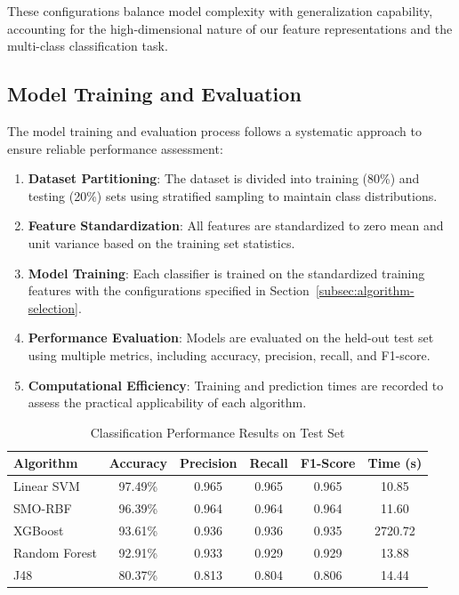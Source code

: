 These configurations balance model complexity with generalization capability, accounting for the high-dimensional nature of our feature representations and the multi-class classification task.

\subsection{Model Training and Evaluation}
\label{subsec:model-training}

The model training and evaluation process follows a systematic approach to ensure reliable performance assessment:

\begin{enumerate}
    \item \textbf{Dataset Partitioning}: The dataset is divided into training (80\%) and testing (20\%) sets using stratified sampling to maintain class distributions.
    
    \item \textbf{Feature Standardization}: All features are standardized to zero mean and unit variance based on the training set statistics.
    
    \item \textbf{Model Training}: Each classifier is trained on the standardized training features with the configurations specified in Section~\ref{subsec:algorithm-selection}.
    
    \item \textbf{Performance Evaluation}: Models are evaluated on the held-out test set using multiple metrics, including accuracy, precision, recall, and F1-score.
    
    \item \textbf{Computational Efficiency}: Training and prediction times are recorded to assess the practical applicability of each algorithm.
\end{enumerate}

\begin{table}[!htbp]
    \centering
    \caption{Classification Performance Results on Test Set}
    \label{tab:classification-results}
    \begin{tabular}{|l|c|c|c|c|c|}
    \hline
    \textbf{Algorithm} & \textbf{Accuracy} & \textbf{Precision} & \textbf{Recall} & \textbf{F1-Score} & \textbf{Time (s)} \\
    \hline
    Linear SVM & 97.49\% & 0.965 & 0.965 & 0.965 & 10.85 \\
    SMO-RBF & 96.39\% & 0.964 & 0.964 & 0.964 & 11.60 \\
    XGBoost & 93.61\% & 0.936 & 0.936 & 0.935 & 2720.72 \\
    Random Forest & 92.91\% & 0.933 & 0.929 & 0.929 & 13.88 \\
    J48 & 80.37\% & 0.813 & 0.804 & 0.806 & 14.44 \\
    \hline
    \end{tabular}
\end{table}

